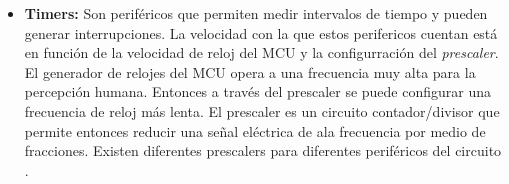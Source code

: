 \begin{itemize}
\item \textbf{Timers:} Son periféricos que permiten medir intervalos de tiempo y pueden generar interrupciones. La velocidad con la que estos perifericos cuentan está en función de la velocidad de reloj del MCU y la configurración del \textit{prescaler}. El generador de relojes del MCU opera a una frecuencia muy alta para la percepción humana. Entonces a través del prescaler se puede configurar una frecuencia de reloj más lenta. El prescaler es un circuito contador/divisor que permite entonces reducir una señal eléctrica de ala frecuencia por medio de fracciones. Existen diferentes prescalers para diferentes periféricos del circuito \cite{presentacion}.
    
\end{itemize}